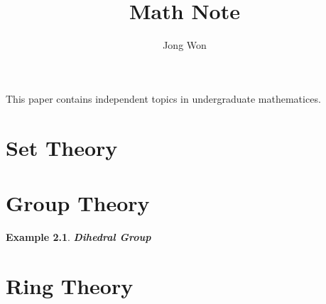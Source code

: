 \documentclass[8pt]{report}
\title{Math Note}
\author{Jong Won}
\affil{University of Seoul, Mathematics}
\date{}
\theoremstyle{romanstyle}
\newtheorem*{example}{Example}
\begin{document}
\maketitle

\newpage
\tableofcontents %
\vspace{3cm}

This paper contains independent topics in undergraduate mathematices.

\chapter{Set Theory}
\chapter{Group Theory}
\begin{example}
    \textbf{Dihedral Group}
\end{example}
\chapter{Ring Theory}
\newpage
\end{document}

